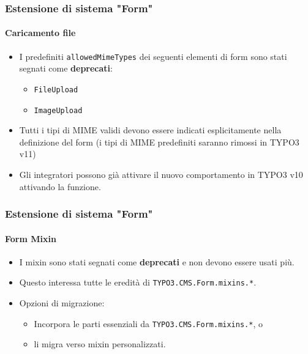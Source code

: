 
\begin{frame}[fragile]
	\frametitle{Estensione di sistema "Form"}
	\framesubtitle{Caricamento file}

	\begin{itemize}
		\item I predefiniti \texttt{allowedMimeTypes} dei seguenti elementi di form sono stati segnati come \textbf{deprecati}:

			\begin{itemize}
				\item \texttt{FileUpload}
				\item \texttt{ImageUpload}
			\end{itemize}

		\item Tutti i tipi di MIME validi devono essere indicati esplicitamente nella definizione del form\newline
			\smaller
				(i tipi di MIME predefiniti saranno rimossi in TYPO3 v11)
			\normalsize

		\item Gli integratori possono già attivare il nuovo comportamento in TYPO3 v10 attivando la funzione.

	\end{itemize}

\end{frame}


\begin{frame}[fragile]
	\frametitle{Estensione di sistema "Form"}
	\framesubtitle{Form Mixin}

	\begin{itemize}
		\item I mixin sono stati segnati come \textbf{deprecati} e non devono essere usati più.
		\item Questo interessa tutte le eredità di \texttt{TYPO3.CMS.Form.mixins.*}.
		\item Opzioni di migrazione:

			\begin{itemize}
				\item Incorpora le parti essenziali da \texttt{TYPO3.CMS.Form.mixins.*}, o
				\item li migra verso mixin personalizzati.
			\end{itemize}

	\end{itemize}

\end{frame}

